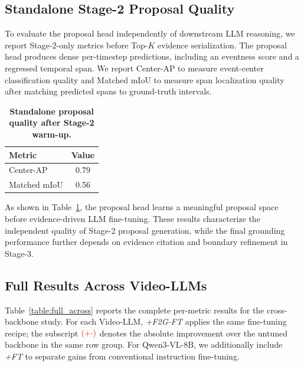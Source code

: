 \documentclass{article}
\newcommand{\impro}[1]{\textcolor{red}{\scriptsize (+#1)}}
\theoremstyle{plain}
\theoremstyle{definition}
\theoremstyle{remark}
\begin{document}
\subsection{Standalone Stage-2 Proposal Quality}
\label{app:stage2_quality}

To evaluate the proposal head independently of downstream LLM reasoning, we report Stage-2-only metrics before Top-$K$ evidence serialization. 
The proposal head produces dense per-timestep predictions, including an eventness score and a regressed temporal span. 
We report Center-AP to measure event-center classification quality and Matched mIoU to measure span localization quality after matching predicted spans to ground-truth intervals.

\begin{table}[t]
\centering
\caption{\textbf{Standalone proposal quality after Stage-2 warm-up.}}
\label{tab:stage2_quality}
\begin{tabular}{lc}
\toprule
Metric & Value \\
\midrule
Center-AP & 0.79 \\
Matched mIoU & 0.56 \\
\bottomrule
\end{tabular}
\end{table}

As shown in Table~\ref{tab:stage2_quality}, the proposal head learns a meaningful proposal space before evidence-driven LLM fine-tuning. 
These results characterize the independent quality of Stage-2 proposal generation, while the final grounding performance further depends on evidence citation and boundary refinement in Stage-3.

\subsection{Full Results Across Video-LLMs}
\label{app:full_results_backbones}
Table~\ref{table:full_across} reports the complete per-metric results for the cross-backbone study.
For each Video-LLM, \textit{+F2G-FT} applies the same fine-tuning recipe; the subscript $\impro{\cdot}$ denotes the absolute improvement over the untuned backbone in the same row group.
For Qwen3-VL-8B, we additionally include \textit{+FT} to separate gains from conventional instruction fine-tuning.
\end{document}
